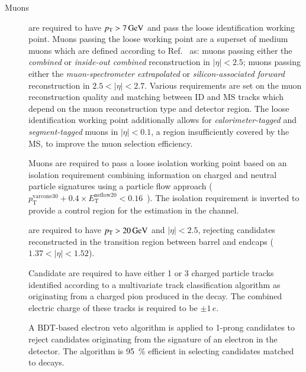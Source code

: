\begin{description}


\item[Muons] are required to have $\pT > \SI{7}{\GeV}$ and pass the
  loose identification working point. Muons passing the loose working
  point are a superset of medium muons which are defined according to
  Ref.~\cite{MUON-2018-03} as: muons passing either the
  \emph{combined} or \emph{inside-out combined} reconstruction in
  $|\eta| < 2.5$; muons passing either the \emph{muon-spectrometer
    extrapolated} or \emph{silicon-associated forward} reconstruction
  in $2.5 < |\eta| < 2.7$. Various requirements are set on the muon
  reconstruction quality and matching between ID and MS tracks which
  depend on the muon reconstruction type and detector region. The
  loose identification working point additionally allows for
  \emph{calorimeter-tagged} and \emph{segment-tagged} muons in
  $|\eta| < 0.1$, a region insufficiently covered by the MS, to
  improve the muon selection efficiency.

  Muons are required to pass a loose isolation working point based on
  an isolation requirement combining information on charged and
  neutral particle signatures using a particle flow approach
  ($p_{\text{T}}^{\text{varcone30}} + 0.4 \times
  E_{\text{T}}^{\text{neflow20}} < 0.16$~\cite{MUON-2018-03}). The
  isolation requirement is inverted to provide a control region for
  the \faketauhadvis estimation in the \lephad channel.




\item[\tauhadvis] are required to have $\pT > \SI{20}{\GeV}$ and
  $|\eta| < 2.5$, rejecting candidates reconstructed in the transition
  region between barrel and endcaps ($1.37 < |\eta| < 1.52$).

  Candidate \tauhadvis are required to have either 1 or 3 charged
  particle tracks identified according to a multivariate track
  classification algorithm as originating from a charged pion produced
  in the \taulepton decay. The combined electric charge of these
  tracks is required to be $\pm 1\,e$.

  A BDT-based electron veto algorithm is applied to 1-prong \tauhadvis
  candidates to reject candidates originating from the signature of an
  electron in the detector. The algorithm is \SI{95}{\percent}
  efficient in selecting \tauhadvis candidates matched to \tauhad
  decays.


\end{description}
